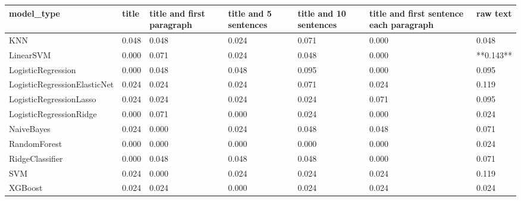 \begin{tabular}{lllllll}
\toprule
                  model\_type & title & title and first paragraph & title and 5 sentences & title and 10 sentences & title and first sentence each paragraph &  raw text \\
\midrule
                         KNN & 0.048 &                     0.048 &                 0.024 &                  0.071 &                                   0.000 &     0.048 \\
                   LinearSVM & 0.000 &                     0.071 &                 0.024 &                  0.048 &                                   0.000 & **0.143** \\
          LogisticRegression & 0.000 &                     0.048 &                 0.048 &                  0.095 &                                   0.000 &     0.095 \\
LogisticRegressionElasticNet & 0.024 &                     0.024 &                 0.024 &                  0.071 &                                   0.024 &     0.119 \\
     LogisticRegressionLasso & 0.024 &                     0.024 &                 0.024 &                  0.024 &                                   0.071 &     0.095 \\
     LogisticRegressionRidge & 0.000 &                     0.071 &                 0.000 &                  0.024 &                                   0.000 &     0.024 \\
                  NaiveBayes & 0.024 &                     0.000 &                 0.024 &                  0.048 &                                   0.048 &     0.071 \\
                RandomForest & 0.000 &                     0.000 &                 0.000 &                  0.000 &                                   0.000 &     0.024 \\
             RidgeClassifier & 0.000 &                     0.048 &                 0.048 &                  0.048 &                                   0.000 &     0.071 \\
                         SVM & 0.024 &                     0.000 &                 0.024 &                  0.024 &                                   0.024 &     0.119 \\
                     XGBoost & 0.024 &                     0.024 &                 0.000 &                  0.024 &                                   0.024 &     0.024 \\
\bottomrule
\end{tabular}
